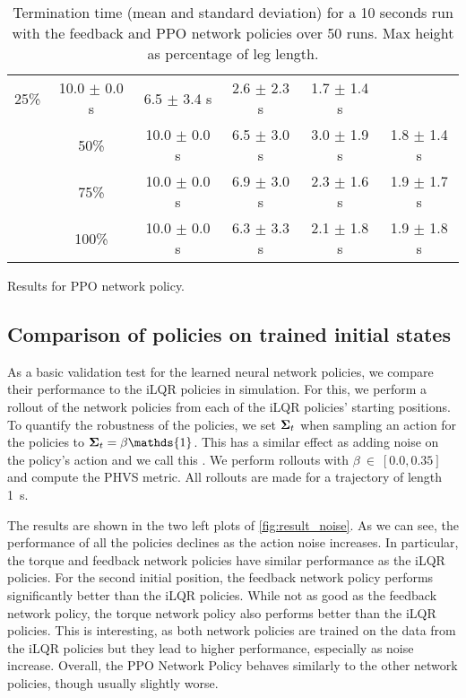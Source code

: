{\begin{table}[h]
\begin{center}
\begin{subtable}[t]{1.0\linewidth}
\begin{tabular}{|c c|c|c|c|c|}
25\% & 10.0 $\pm$ 0.0 s & 6.5 $\pm$ 3.4 s & 2.6 $\pm$ 2.3 s & 1.7 $\pm$ 1.4 s\\
\cline{2-6}
& 50\% & 10.0 $\pm$ 0.0 s & 6.5 $\pm$ 3.0 s & 3.0 $\pm$ 1.9 s & 1.8 $\pm$ 1.4 s\\
\cline{2-6}
& 75\% & 10.0 $\pm$ 0.0 s & 6.9 $\pm$ 3.0 s & 2.3 $\pm$ 1.6 s & 1.9 $\pm$ 1.7 s\\
\cline{2-6}
& 100\% & 10.0 $\pm$ 0.0 s & 6.3 $\pm$ 3.3 s & 2.1 $\pm$  1.8 s & 1.9 $\pm$  1.8 s\\
\hline
\end{tabular}
\caption{Results for PPO network policy.}\label{table:res_marathon_ppo}
\end{subtable}
%
\end{center}
\vspace{-0.5cm}
\caption{Termination time (mean and standard deviation) for a 10 seconds run with the feedback and PPO network policies over 50 runs. Max height as percentage of leg length.}
\label{table:res_marathon}
\vspace{-0.3cm}
\end{table}}
\vspace{-0.3cm}
\subsection{Comparison of policies on trained initial states}
\label{sec:result_sim_perf}
%
As a basic validation test for the learned neural network policies, we compare their performance to the iLQR policies in simulation. For this, we perform a rollout of the network policies from each of the iLQR policies' starting positions. To quantify the robustness of the policies, we set $\bm{\Sigma}_t$ when sampling an action for the policies to $\b{\Sigma}_t=\beta \mathds{1}$. This has a similar effect as adding noise on the policy's action and we call this . We perform rollouts with $\beta~\in~[0.0, 0.35]$ and compute the PHVS metric. All rollouts are made for a trajectory of length \SI{1}{\second}.

The results are shown in the two left plots of \cref{fig:result_noise}. As we can see, the performance of all the policies declines as the action noise increases. In particular, the torque and feedback network policies have similar performance as the iLQR policies. For the second initial position, the feedback network policy performs significantly better than the iLQR policies. While not as good as the feedback network policy, the torque network policy also performs better than the iLQR policies.
This is interesting, as both network policies are trained on the data from the iLQR policies but they lead to higher performance, especially as noise increase. Overall, the PPO Network Policy behaves similarly to the other network policies, though usually slightly worse.

